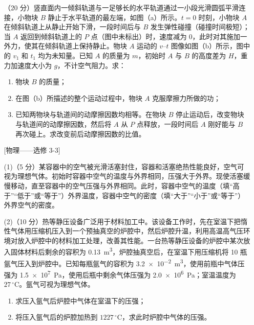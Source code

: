 \begin{question}
（20 分）竖直面内一倾斜轨道与一足够长的水平轨道通过一小段光滑圆弧平滑连接，小物块 $B$ 静止于水平轨道的最左端，如图（a）所示。$t=0$ 时刻，小物块 $A$ 在倾斜轨道上从静止开始下滑，一段时间后与 $B$ 发生弹性碰撞（碰撞时间极短）；当 $A$ 返回到倾斜轨道上的 $P$ 点（图中未标出）时，速度减为 0，此时对其施加一外力，使其在倾斜轨道上保持静止。物块 $A$ 运动的 $v$--$t$ 图像如图（b）所示，图中的 $v_{1}$ 和 $t_{1}$ 均为未知量。已知 $A$ 的质量为 $m$，初始时 $A$ 与 $B$ 的高度差为 $H$，重力加速度大小为 $g$，不计空气阻力。求：
\begin{enumerate}[leftmargin=2em, label=(\arabic*)]
  \item 物块 $B$ 的质量；
  \item 在图（b）所描述的整个运动过程中，物块 $A$ 克服摩擦力所做的功；
  \item 已知两物块与轨道间的动摩擦因数均相等。在物块 $B$ 停止运动后，改变物块与轨道间的动摩擦因数，然后将 $A$ 从 $P$ 点释放，一段时间后 $A$ 刚好能与 $B$ 再次碰上。求改变前后动摩擦因数的比值。
\end{enumerate}

\end{question}


\begin{question}
[物理——选修 3-3]

(1)（5 分）某容器中的空气被光滑活塞封住，容器和活塞绝热性能良好，空气可视为理想气体。初始时容器中空气的温度与外界相同，压强大于外界。现使活塞缓慢移动，直至容器中的空气压强与外界相同。此时，容器中空气的温度\gkblank（填“高于”“低于”或“等于”）外界温度，容器中空气的密度\gkblank（填“大于”“小于”或“等于”）外界空气的密度。

(2)（10 分）热等静压设备广泛用于材料加工中。该设备工作时，先在室温下把惰性气体用压缩机压入到一个预抽真空的炉腔中，然后炉腔升温，利用高温高气压环境对放入炉腔中的材料加工处理，改善其性能。一台热等静压设备的炉腔中某次放入固体材料后剩余的容积为 \SI{0.13}{\metre\cubed}，炉腔抽真空后，在室温下用压缩机将 10 瓶氩气压入到炉腔中。已知每瓶氩气的容积为 \SI{3.2e-2}{\metre\cubed}，使用前瓶中气体压强为 \SI{1.5e7}{\pascal}，使用后瓶中剩余气体压强为 \SI{2.0e6}{\pascal}；室温温度为 $27\,^{\circ}\mathrm{C}$。氩气可视为理想气体。

\begin{enumerate}[leftmargin=2em, label=(\roman*)]
  \item 求压入氩气后炉腔中气体在室温下的压强；
  \item 将压入氩气后的炉腔加热到 $1227\,^{\circ}\mathrm{C}$，求此时炉腔中气体的压强。
\end{enumerate}
\end{question}

